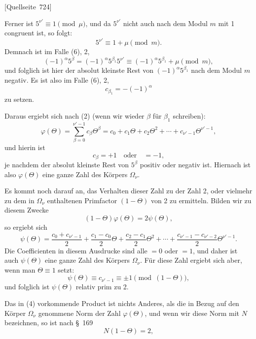 \documentclass[11pt]{article}
\newcommand{\srcpage}[1]{\par\medskip\noindent\textsf{[Quellseite~#1]}\par\smallskip}
\begin{document}
\srcpage{724}
Ferner ist $5^{\nu'}\equiv1\pmod\mu$, und da $5^{\nu'}$ nicht auch nach dem Modul $m$ mit 1 congruent ist, so folgt:
\begin{equation}
5^{\nu'}\equiv1+\mu\pmod m.
\tag{7}
\end{equation}
Demnach ist im Falle (6), 2,
\[
(-1)^\alpha5^\beta=(-1)^\alpha5^{\beta_1}5^{\nu'}\equiv(-1)^\alpha5^{\beta_1}+\mu\pmod m,
\]
und folglich ist hier der absolut kleinste Rest von $(-1)^\alpha5^{\beta_1}$ nach dem Modul $m$ negativ. Es ist also im Falle (6), 2,
\[
c_{\beta_1}=-(-1)^\alpha
\]
zu setzen.

Daraus ergiebt sich nach (2) (wenn wir wieder $\beta$ für $\beta_1$ schreiben):
\begin{equation}
\varphi(\Theta)=\sum_{\beta=0}^{\nu'-1}c_\beta\Theta^\beta
=c_0+c_1\Theta+c_2\Theta^2+\cdots+c_{\nu'-1}\Theta^{\nu'-1},
\tag{8}
\end{equation}
und hierin ist
\begin{equation}
c_\beta=+1\quad\text{oder}\quad=-1,
\tag{9}
\end{equation}
je nachdem der absolut kleinste Rest von $5^\beta$ positiv oder negativ ist. Hiernach ist also $\varphi(\Theta)$ eine ganze Zahl des Körpers $\Omega_\nu$.

Es kommt noch darauf an, das Verhalten dieser Zahl zu der Zahl 2, oder vielmehr zu dem in $\Omega_\nu$ enthaltenen Primfactor $(1-\Theta)$ von 2 zu ermitteln. Bilden wir zu diesem Zwecke
\begin{equation}
(1-\Theta)\varphi(\Theta)=2\psi(\Theta),
\tag{10}
\end{equation}
so ergiebt sich
\begin{equation}
\psi(\Theta)=\frac{c_0+c_{\nu'-1}}2+\frac{c_1-c_0}2\Theta+\frac{c_2-c_1}2\Theta^2+\cdots+
\frac{c_{\nu'-1}-c_{\nu'-2}}2\Theta^{\nu'-1}.
\tag{11}
\end{equation}
Die Coefficienten in diesem Ausdrucke sind alle $=0$ oder $=1$, und daher ist auch $\psi(\Theta)$ eine ganze Zahl des Körpers $\Omega_\nu$. Für diese Zahl ergiebt sich aber, wenn man $\Theta\equiv1$ setzt:
\begin{equation}
\psi(\Theta)\equiv c_{\nu'-1}\equiv\pm1\pmod{(1-\Theta)},
\tag{12}
\end{equation}
und folglich ist $\psi(\Theta)$ relativ prim zu 2.

Das in (4) vorkommende Product ist nichts Anderes, als die in Bezug auf den Körper $\Omega_\nu$ genommene Norm der Zahl $\varphi(\Theta)$, und wenn wir diese Norm mit $N$ bezeichnen, so ist nach \S~169
\[
N(1-\Theta)=2,
\]
\end{document}

